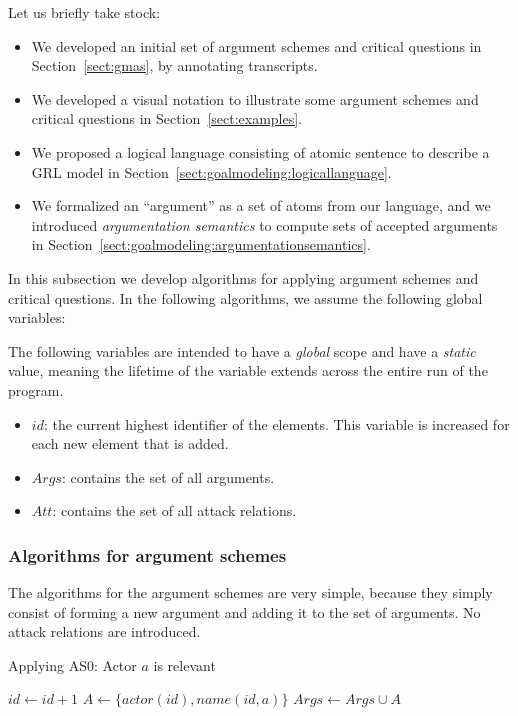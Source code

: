 Let us briefly take stock:
\begin{itemize}
\item We developed an initial set of argument schemes and critical questions in Section~\ref{sect:gmas}, by annotating transcripts.
\item We developed a visual notation to illustrate some argument schemes and critical questions in Section~\ref{sect:examples}.
\item We proposed a logical language consisting of atomic sentence to describe a GRL model in Section~\ref{sect:goalmodeling:logicallanguage}.
\item We formalized an ``argument'' as a set of atoms from our language, and we introduced \emph{argumentation semantics} to compute sets of accepted arguments in Section~\ref{sect:goalmodeling:argumentationsemantics}.
\end{itemize}

In this subsection we develop algorithms for applying argument schemes and critical questions. In the following algorithms, we assume the following global variables:

\begin{definition} The following variables are intended to have a \emph{global} scope and have a \emph{static} value, meaning the lifetime of the variable extends across the entire run of the program.
\begin{itemize}
\item $id$: the current highest identifier of the elements. This variable is increased for each new element that is added.
\item $Args$: contains the set of all arguments.
\item $Att$: contains the set of all attack relations.
\end{itemize}
\end{definition}


\subsubsection*{Algorithms for argument schemes}
The algorithms for the argument schemes are very simple, because they simply consist of forming a new argument and adding it to the set of arguments. No attack relations are introduced.

\begin{algorithm}[h]
  \caption{Applying AS0: Actor $a$ is relevant}\label{alg:as0}
  \begin{algorithmic}[1]
    \State $id\gets id+1$\label{alg:as0:1}
    \State $A \gets \{actor(id), name(id,a)\}$\label{alg:as0:2}
    \State $Args \gets Args \cup A$\label{alg:as0:3}
    \EndProcedure
  \end{algorithmic}
\end{algorithm}

